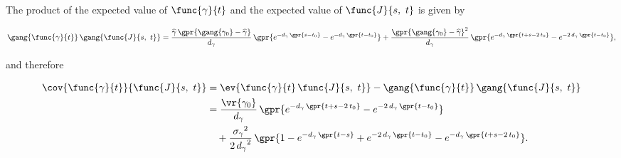 The product of the expected value of $\func{\gamma}{t}$ and the expected value of $\func{J}{s,\ t}$ is given by

\begin{equation}
	\gang{\func{\gamma}{t}}\,\gang{\func{J}{s,\ t}} = \frac{\widehat{\gamma}\,\gpr{\gang{\gamma_0} - \widehat{\gamma}}}{d_{\gamma}}\,\gpr{e^{-d_{\gamma}\,\gpr{s - t_0}} - e^{-d_{\gamma}\,\gpr{t - t_0}}} + \frac{\gpr{\gang{\gamma_0} - \widehat{\gamma}}^2}{d_{\gamma}}\,\gpr{e^{-d_{\gamma}\,\gpr{t + s - 2\,t_0}} - e^{-2\,d_{\gamma}\,\gpr{t - t_0}}},
\end{equation}

and therefore

\begin{align}
	\cov{\func{\gamma}{t}}{\func{J}{s,\ t}} &= \ev{\func{\gamma}{t}\,\func{J}{s,\ t}} - \gang{\func{\gamma}{t}}\,\gang{\func{J}{s,\ t}} \nonumber \\
		&= \frac{\vr{\gamma_0}}{d_{\gamma}}\,\gpr{e^{-d_{\gamma}\,\gpr{t + s - 2\,t_0}} - e^{-2\,d_{\gamma}\,\gpr{t - t_0}}} \nonumber \\
			&\quad + \frac{{\sigma_{\gamma}}^2}{2\,{d_{\gamma}}^2}\,\gpr{1 - e^{-d_{\gamma}\,\gpr{t - s}} + e^{-2\,d_{\gamma}\,\gpr{t - t_0}} - e^{-d_{\gamma}\,\gpr{t + s - 2\,t_0}}}. \label{eqn:cov_gammat_Jst}
\end{align}